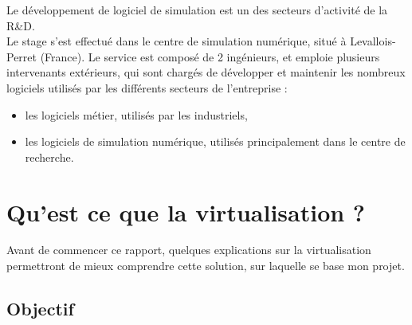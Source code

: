 Le développement de logiciel de simulation est un des secteurs d'activité de la R\&D.
\\


Le stage s'est effectué dans le centre de simulation numérique, situé à Levallois-Perret (France).
Le service est composé de 2 ingénieurs, et emploie plusieurs intervenants extérieurs, qui sont chargés de développer et maintenir les nombreux logiciels utilisés par les différents secteurs de l'entreprise :
\begin{itemize}
	\item les logiciels métier, utilisés par les industriels,
	\item les logiciels de simulation numérique, utilisés principalement dans le centre de recherche.
\\
\end{itemize}






\section{Qu'est ce que la virtualisation ?}

Avant de commencer ce rapport, quelques explications sur la virtualisation permettront de mieux comprendre cette solution, sur laquelle se base mon projet.
\\





\subsection{Objectif}

